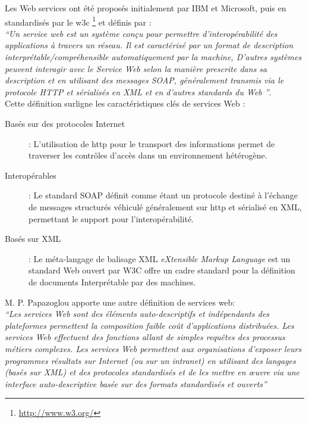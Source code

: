     Les Web services ont été proposés initialement par IBM
    \cite{kreger2001web} et Microsoft, puis en standardisés par le
    \acrshort{w3c} \footnote{\url{http://www.w3.org/}} et définis
    \cite{WSA} par :\\


    \emph{``Un service web est un système conçu pour permettre
      d'interopérabilité des applications à travers un réseau.  Il est
      caractérisé par un format de description
      interprétable/compréhensible automatiquement par la machine,
      D'autres systèmes peuvent interagir avec le Service Web selon la
      manière prescrite dans sa description et en utilisant des messages
      SOAP, généralement transmis via
      le protocole HTTP et sérialisés en XML et en d'autres standards du Web ''}.\\

    Cette définition surligne les caractéristiques clés de services Web
    \cite{fremantle2002enterprise}:

    \SpecialItem
    \begin{description} %
    \item[Basés sur des protocoles Internet] : L'utilisation de
      \acrshort{http} pour le transport des informations permet de
      traverser les contrôles d'accès dans un environnement hétérogène.
  
    \item[Interopérables] : Le standard \textsc{SOAP} \cite{box2000simple}
      définit comme étant un protocole destiné à l'échange de messages
      structurés véhiculé généralement sur \acrshort{http} et sérialisé en
      \textsc{XML}, permettant le support pour l'interopérabilité.
      
    \item[Basés sur XML] : Le méta-langage de balisage \textsc{XML}
      \textit{eXtensible Markup Language} est un standard Web ouvert par
      \textsc{W3C} \cite{bray1998extensible} offre un cadre standard pour
      la définition de documents Interprétable par des machines.
    \end{description}
    
    M. P. Papazoglou \cite{papazoglou2003service} apporte une autre
    définition de services web:\\
    \emph{``Les services Web sont des éléments auto-descriptifs et
      indépendants des plateformes permettent la composition faible
      coût d’applications distribuées. Les services Web effectuent des
      fonctions allant de simples requêtes des processus métiers
      complexes. Les services Web permettent aux organisations
      d’exposer leurs programmes résultats sur Internet (ou sur un
      intranet) en utilisant des langages (basés sur XML) et des
      protocoles standardisés et de les mettre en œuvre via une
      interface auto-descriptive basée sur des formats standardisés et
      ouverts''}
    
